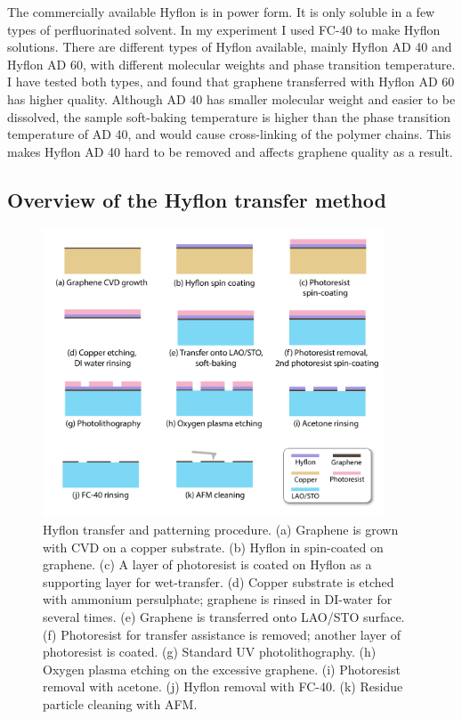 \documentclass[pdflatex, sectionletters, 12pt]{pittetd}    %
\begin{document}
The commercially available Hyflon is in power form. It is only soluble in a few types of perfluorinated solvent. In my experiment I used FC-40 to make Hyflon solutions. There are different types of Hyflon available, mainly Hyflon AD 40 and Hyflon AD 60, with different molecular weights and phase transition temperature. I have tested both types, and found that graphene transferred with Hyflon AD 60 has higher quality. Although AD 40 has smaller molecular weight and easier to be dissolved, the sample soft-baking temperature is higher than the phase transition temperature of AD 40, and would cause cross-linking of the polymer chains. This makes Hyflon AD 40 hard to be removed and affects graphene quality as a result. 

\subsection{Overview of the Hyflon transfer method}

\begin{figure}[p]
	\centering
	\includegraphics[width=0.9\textwidth]{Drawing/HyflonTransfer.pdf}
	\caption{Hyflon transfer and patterning procedure. (a) Graphene is grown with CVD on a copper substrate. (b) Hyflon in spin-coated on graphene. (c) A layer of photoresist is coated on Hyflon as a supporting layer for wet-transfer. (d) Copper substrate is etched with ammonium persulphate; graphene is rinsed in DI-water for several times. (e) Graphene is transferred onto LAO/STO surface. (f) Photoresist for transfer assistance is removed; another layer of photoresist is coated. (g) Standard UV photolithography. (h) Oxygen plasma etching on the excessive graphene. (i) Photoresist removal with acetone. (j) Hyflon removal with FC-40. (k) Residue particle cleaning with AFM.}
	\label{FIG:HyflonTransfer}
\end{figure}
\end{document}
